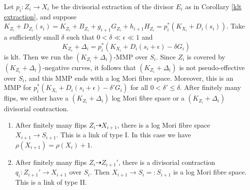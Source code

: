 \documentclass[11pt]{amsart}
\numberwithin{equation}{section}
\theoremstyle{definition}
\theoremstyle{definition}
\theoremstyle{definition}
\begin{document}
\begin{enumerate}
  Let $p_{i}:Z_{i}\to X_{i}$ be the divisorial extraction of the divisor $E_{i}$ as in Corollary \ref{klt extraction}, and suppose $K_{Z_{i}}+D_{Z_{i}}(s_{i})=K_{Z_{i}}+B_{Z_{i}}+g_{i+1}G_{Z_{i}}+h_{i+1}H_{Z_{i}}=p_{i}^*\left(K_{X_{i}}+D_{i}\left(s_{i}\right)\right)$.
  Take a sufficiently small $\delta$ such that $0<\delta \ll \epsilon \ll 1$ and
  \[
    K_{Z_{i}}+\Delta_{i}=p_{i}^*(K_{X_{i}}+D_{i}(s_{i}+\epsilon)-\delta G_{i})
  \]
  is klt. Then we run the $(K_{Z_{i}}+\Delta_{i})$-MMP  over $S_{i}$. Since $Z_{i}$ is covered by $(K_{Z_{i}}+\Delta_{i})$-negative curves, it follows that $(K_{Z_{i}}+\Delta_{i})$ is not pseudo-effective over $S_{i}$, and this MMP ends with a log Mori fibre space. Moreover, this is an MMP for $p_{i}^*(K_{X_{i}}+D_{i}(s_{i}+\epsilon)-\delta'G_{i})$ for all $0<\delta'\leqslant\delta$. After finitely many flips, we either have a $(K_{Z_{i}}+\Delta_{i})$ log Mori fibre space or a $(K_{Z_{i}}+\Delta_{i})$ divisorial contraction.
  \begin{enumerate}
    \item\label{b1} After finitely many flips $Z_{i}\dashrightarrow X_{i+1}$, there is a log Mori fibre space $X_{i+1}\to S_{i+1}$. This is a link of type I. In this case we have $\rho(X_{i+1})=\rho(X_{i})+1$.
    \item\label{b2} After finitely many flips $Z_{i}\dashrightarrow Z_{i+1}'$, there is a divisorial contraction $q_{i}:Z_{i+1}'\to X_{i+1}$ over $S_i$. Then $X_{i+1}\to S_{i}=:S_{i+1}$ is a log Mori fibre space. This is a link of type II.
  \end{enumerate}
\end{enumerate}
\end{document}
